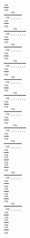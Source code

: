 \documentclass[11pt]{article}
\begin{document}
\begin{center}
\bigskip
\\$\frac{\Rightarrow }{\Rightarrow }$
\bigskip
\\$\frac{\Rightarrow }{\Rightarrow , , , , , }$
\bigskip
\\$\frac{\Rightarrow }{\Rightarrow }$
\bigskip
\\$\frac{\Rightarrow }{\Rightarrow , , , , , , , }$
\bigskip
\\$\frac{\Rightarrow }{\Rightarrow }$
\bigskip
\\$\frac{\Rightarrow }{\Rightarrow , , , , , }$
\bigskip
\\$\frac{\Rightarrow }{\Rightarrow }$
\bigskip
\\$\frac{\Rightarrow }{\Rightarrow , , , , , , , }$
\bigskip
\\$\frac{\Rightarrow }{\Rightarrow }$
\bigskip
\\$\frac{\Rightarrow }{\Rightarrow , , , , , }$
\bigskip
\\$\frac{\Rightarrow }{\Rightarrow }$
\bigskip
\\$\frac{\Rightarrow }{\Rightarrow , , , , , , , }$
\bigskip
\\$\frac{\Rightarrow }{\Rightarrow }$
\bigskip
\\$\frac{\Rightarrow }{\Rightarrow , , , , , }$
\bigskip
\\$\frac{\Rightarrow }{\Rightarrow }$
\bigskip
\\$\frac{\Rightarrow }{\Rightarrow , , , , , , , }$
\bigskip
\\$\frac{\Rightarrow }{\Rightarrow }$
\bigskip
\\$\frac{\Rightarrow }{\Rightarrow , , , , , }$
\bigskip
\\$\frac{\Rightarrow }{\Rightarrow }$
\bigskip
\\$\frac{\Rightarrow }{\Rightarrow }$
\bigskip
\\$\frac{\Rightarrow }{\Rightarrow }$
\bigskip
\\$\frac{\Rightarrow }{\Rightarrow , , , , , }$
\bigskip
\\$\frac{\Rightarrow }{\Rightarrow }$
\bigskip
\\$\frac{\Rightarrow }{\Rightarrow }$
\bigskip
\\$\frac{\Rightarrow }{\Rightarrow }$
\bigskip
\\$\frac{\Rightarrow }{\Rightarrow , , , , , }$
\bigskip
\\$\frac{\Rightarrow }{\Rightarrow }$
\bigskip
\\$\frac{\Rightarrow }{\Rightarrow }$
\bigskip
\\$\frac{\Rightarrow }{\Rightarrow }$

\end{center}
\end{document}
